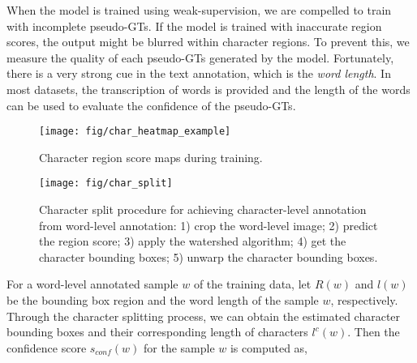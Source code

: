 \documentclass[10pt,twocolumn,letterpaper]{article}
\begin{document}
When the model is trained using weak-supervision, we are compelled to train with incomplete pseudo-GTs. 
If the model is trained with inaccurate region scores, the output might be blurred within character regions. 
To prevent this, we measure the quality of each pseudo-GTs generated by the model.
Fortunately, there is a very strong cue in the text annotation, which is the \textit{word length}. 
In most datasets, the transcription of words is provided and the length of the words can be used to evaluate the confidence of the pseudo-GTs.

\begin{figure}[t]
  \texttt{[image: fig/char\_heatmap\_example]}
\caption{Character region score maps during training.}
  \label{fig:scoremapduringtraining} 
\end{figure}

\begin{figure*}[h!]
  \centering
  \texttt{[image: fig/char\_split]}
\caption{Character split procedure for achieving character-level annotation from word-level annotation: 1) crop the word-level image; 2) predict the region score; 3) apply the watershed algorithm; 4) get the character bounding boxes; 5) unwarp the character bounding boxes.} 
  \label{fig:charactersplit} 
\end{figure*}

For a word-level annotated sample $w$ of the training data, let $R(w)$ and $l(w)$ be the bounding box region and the word length of the sample $w$, respectively.
Through the character splitting process, we can obtain the estimated character bounding boxes and their corresponding length of characters $l^c(w)$.
Then the confidence score $s_{conf}(w)$ for the sample $w$ is computed as,
\end{document}
